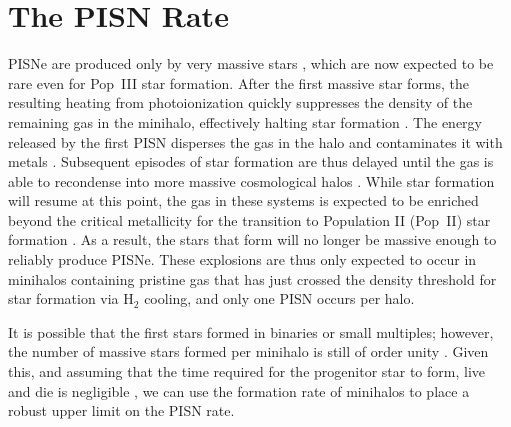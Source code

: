 \documentclass{thesis}
\begin{document}
\section{The PISN Rate}
PISNe are produced only by very massive stars
\citep{BrommKudritzkiLoeb2001, Schaerer2002, Hegeretal2003}, which are
now expected to be rare even for Pop~III star formation.  After the
first massive star forms, the resulting heating from photoionization
quickly suppresses the density of the remaining gas in the minihalo,
effectively halting star formation \citep{Kitayamaetal2004,
  WhalenAbelNorman2004, AlvarezBrommShapiro2006}. The energy released
by the first PISN disperses the gas in the halo and contaminates it
with metals \citep{BrommYoshidaHernquist2003, Greifetal2007,
  Whalenetal2008, WiseAbel2008, Greifetal2010}.  Subsequent episodes
of star formation are thus delayed until the gas is able to recondense
into more massive cosmological halos \citep{YoshidaBrommHernquist2004,
  Yoshidaetal2007, JohnsonGreifBromm2007, AlvarezWiseAbel2009}.  While
star formation will resume at this point, the gas in these systems is
expected to be enriched beyond the critical metallicity for the
transition to Population II (Pop~II) star formation \citep{WiseAbel2007, WiseAbel2008,
  Greifetal2007, Greifetal2008, Greifetal2010}. As a result, the stars
that form will no longer be massive enough to reliably produce PISNe.
These explosions are thus only expected to occur in minihalos
containing pristine gas that has just crossed the density threshold
for star formation via H$_2$ cooling, and only one PISN occurs per halo.

It is possible that the first stars formed in binaries or small
multiples; however, the number of massive stars formed per minihalo is
still of order unity \citep{StacyGreifBromm2010, Clarketal2011b,
  Greifetal2011}.  Given this, and assuming that the time required for the
progenitor star to form, live and die is negligible
\citep{Hegeretal2003}, we can use the formation rate of minihalos to
place a robust upper limit on the PISN rate.
\end{document}
